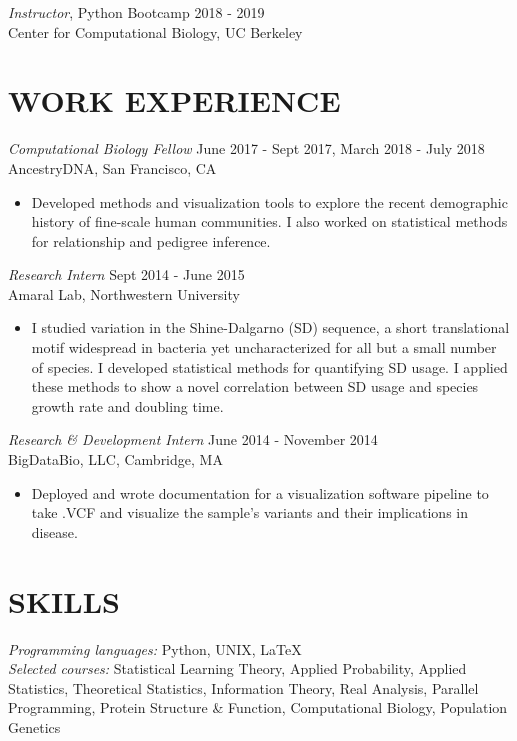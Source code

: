 \documentclass[margin, 10pt]{res} %
\begin{document}
\begin{resume}
{\sl Instructor}, Python Bootcamp \hfill 2018 - 2019 \\
Center for Computational Biology, UC Berkeley

\section{WORK EXPERIENCE}

{\sl Computational Biology Fellow} \hfill June 2017 - Sept 2017, March 2018 - July 2018 \\
AncestryDNA, San Francisco, CA
\begin{itemize}
\item[] Developed methods and visualization tools to explore the recent demographic history of fine-scale human communities. I also worked on statistical methods for relationship and pedigree inference. 
\end{itemize} 

{\sl Research Intern} \hfill Sept 2014 - June 2015 \\
Amaral Lab, Northwestern University
\begin{itemize}
\item[] I studied variation in the Shine-Dalgarno (SD) sequence, a short translational motif widespread in bacteria yet uncharacterized for all but a small number of species. I developed statistical methods for quantifying SD usage. I applied these methods to show a novel correlation between SD usage and species growth rate and doubling time.
\end{itemize} 

{\sl Research \& Development Intern} \hfill June 2014 - November 2014\\
BigDataBio, LLC, Cambridge, MA
\begin{itemize}
\item[] Deployed and wrote documentation for a visualization software pipeline to take .VCF and visualize the sample’s variants and their implications in disease.
\end{itemize} 


\section{SKILLS} 

{\sl Programming languages:} Python, UNIX, \LaTeX\\
{\sl Selected courses:} Statistical Learning Theory, Applied Probability, Applied Statistics, Theoretical Statistics, Information Theory, Real Analysis, Parallel Programming, Protein Structure \& Function, Computational Biology, Population Genetics


\end{resume}
\end{document}
